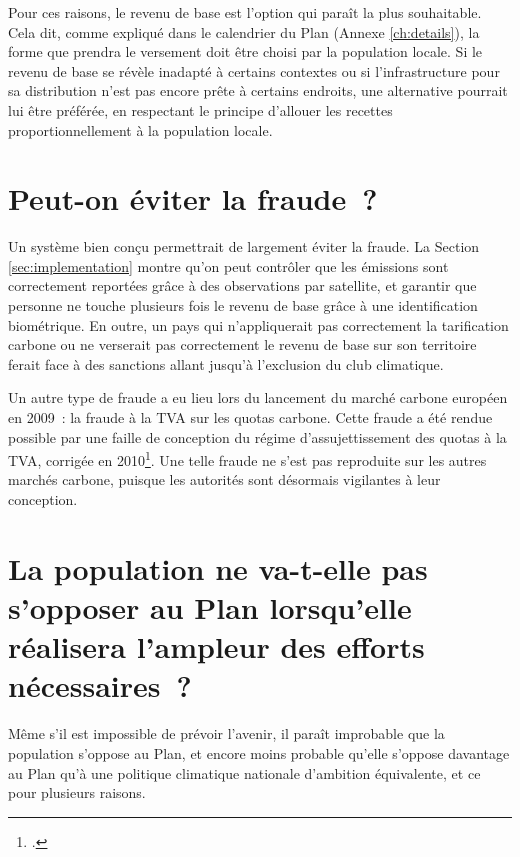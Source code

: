 \documentclass[a5paper,french,openany]{memoir}
\begin{document}
Pour ces raisons, le revenu de base est l'option qui paraît la plus souhaitable. Cela dit, comme expliqué dans le calendrier du Plan (Annexe \ref{ch:details}), la forme que prendra le versement doit être choisi par la population locale. Si le revenu de base se révèle inadapté à certains contextes ou si l'infrastructure pour sa distribution n'est pas encore prête à certains endroits, une alternative pourrait lui être préférée, en respectant le principe d'allouer les recettes proportionnellement à la population locale. 

\section*{\normalsize Peut-on éviter la fraude~?}\label{q:fraude}

Un système bien conçu permettrait de largement éviter la fraude. La Section \ref{sec:implementation} montre qu'on peut contrôler que les émissions sont correctement reportées grâce à des observations par satellite, et garantir que personne ne touche plusieurs fois le revenu de base grâce à une identification biométrique. En outre, un pays qui n'appliquerait pas correctement la tarification carbone ou ne verserait pas correctement le revenu de base sur son territoire ferait face à des sanctions allant jusqu'à l'exclusion du club climatique. 

Un autre type de fraude a eu lieu lors du lancement du marché carbone européen en 2009~: la fraude à la TVA sur les quotas carbone. Cette fraude a été rendue possible par une faille de conception du régime d'assujettissement des quotas à la TVA, corrigée en 2010\footnote{\cite{cour_des_comptes_fraude_2012}.}. Une telle fraude ne s'est pas reproduite sur les autres marchés carbone, puisque les autorités sont désormais vigilantes à leur conception.


\section*{\normalsize La population ne va-t-elle pas s'opposer au Plan lorsqu'elle réalisera l'ampleur des efforts nécessaires~?}\label{q:soutien}

Même s'il est impossible de prévoir l'avenir, il paraît improbable que la population s'oppose au Plan, et encore moins probable %
qu'elle s'oppose davantage au Plan qu'à une politique climatique nationale d'ambition équivalente, et ce pour plusieurs raisons. 
\end{document}
